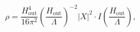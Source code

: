 \begin{equation}\label{eq:density}
  \rho=\frac{H_\mathrm{out}^4}{16\pi^2}
  \left(\frac{H_\mathrm{out}}{\Lambda}\right)^{-2}
  |X|^2 \cdot 
  I\left(\frac{H_\mathrm{out}}{\Lambda}\right),
\end{equation}

